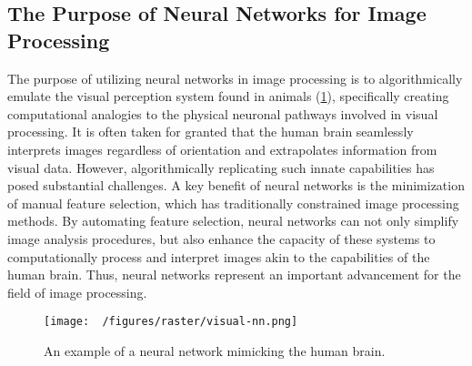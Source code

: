 \subsection{The Purpose of Neural Networks for Image Processing}

The purpose of utilizing neural networks in image processing is to algorithmically emulate the visual perception system found in animals (\cref{fig:nn-purpose-zebra}), specifically creating computational analogies to the physical neuronal pathways involved in visual processing.
It is often taken for granted that the human brain seamlessly interprets images regardless of orientation and extrapolates information from visual data. However, algorithmically replicating such innate capabilities has posed substantial challenges.
A key benefit of neural networks is the minimization of manual feature selection, which has traditionally constrained image processing methods.
By automating feature selection, neural networks can not only simplify image analysis procedures, but also enhance the capacity of these systems to computationally process and interpret images akin to the capabilities of the human brain.
Thus, neural networks represent an important advancement for the field of image processing.


\begin{figure}[h!]
  \centering
  \texttt{[image: ~/figures/raster/visual-nn.png]}
  \caption{An example of a neural network mimicking the human brain.}
  \label{fig:nn-purpose-zebra}
\end{figure}

